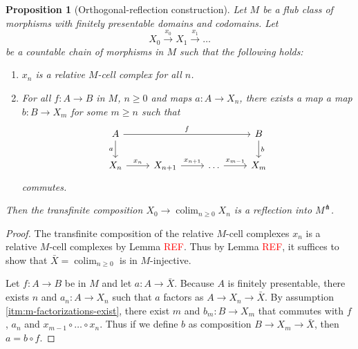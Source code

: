 \documentclass[a4paper]{article}
\newcommand{\todo}[1]{\textcolor{red}{#1}}
\newtheorem{proposition}[theorem]{Proposition}
\theoremstyle{remark}
\theoremstyle{definition}
\begin{document}
\begin{proposition}[Orthogonal-reflection construction]
  \label{prop:orth-refl-constr-prop}
  Let $M$ be a flub class of morphisms with finitely presentable domains and codomains.
  Let
  \begin{equation}
    X_0 \xrightarrow{x_0} X_1 \xrightarrow{x_1} \dots
  \end{equation}
  be a countable chain of morphisms in $M$ such that the following holds:
  \begin{enumerate}
    \item
      $x_n$ is a relative $M$-cell complex for all $n$.
    \item
      \label{itm:m-factorizations-exist}
      For all $f : A \rightarrow B$ in $M$, $n \geq 0$ and maps $a : A \rightarrow X_n$, there exists a map a map $b : B \rightarrow X_m$ for some $m \geq n$ such that
      \begin{equation}
        \begin{tikzcd}
          A \arrow[rrr, "f"] \arrow[d, "a"'] & & & B \arrow[d, "b"] \\
          X_n \arrow[r, "x_n"] & X_{n + 1} \arrow[r, "x_{n + 1}"] & \dots \arrow[r, "x_{m - 1}"] & X_m
        \end{tikzcd}
      \end{equation}
      commutes.
  \end{enumerate}
  Then the transfinite composition $X_0 \rightarrow \operatorname{colim}_{n \geq 0} X_n$ is a reflection into $M^\pitchfork$.
\end{proposition}
\begin{proof}
  The transfinite composition of the relative $M$-cell complexes $x_n$ is a relative $M$-cell complexes by Lemma \todo{REF}.
  Thus by Lemma \todo{REF}, it suffices to show that $\bar X = \operatorname{colim}_{n \geq 0}$ is in $M$-injective.

  Let $f : A \rightarrow B$ be in $M$ and let $a : A \rightarrow \bar X$.
  Because $A$ is finitely presentable, there exists $n$ and $a_n : A \rightarrow X_n$ such that $a$ factors as $A \rightarrow X_n \rightarrow \bar X$.
  By assumption \ref{itm:m-factorizations-exist}, there exist $m$ and $b_m : B \rightarrow X_m$ that commutes with $f$, $a_n$ and $x_{m - 1} \circ \dots \circ x_n$.
  Thus if we define $b$ as composition $B \rightarrow X_m \rightarrow \bar X$, then $a = b \circ f$.
\end{proof}
\end{document}
